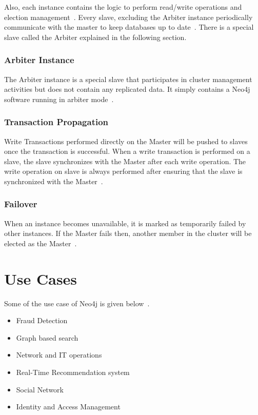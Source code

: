 \documentclass[9pt,twocolumn,twoside]{../../styles/osajnl}
\begin{document}
Also, each instance contains the logic to perform read/write operations and election management~\cite{www-neo4j-ha}. Every slave, excluding the Arbiter instance periodically communicate with the master to keep databases up to date~\cite{www-neo4j-ha}. There is a special slave called the Arbiter explained in the following section.
\subsubsection{Arbiter Instance}
The Arbiter instance is a special slave  that participates in cluster management activities but does not contain any replicated data. It simply contains a Neo4j software running in arbiter mode~\cite{www-neo4j-ha}. 
\subsubsection{Transaction Propagation}
Write Transactions performed directly on the Master will be pushed to slaves once the transaction is successful. When a write transaction is performed on a slave, the slave synchronizes with the Master after each write operation. The write operation on slave is always performed after ensuring that the slave is synchronized with the Master~\cite{www-neo4j-ha}. 

\subsubsection{Failover}
When an instance becomes unavailable, it is marked as temporarily failed by other instances. If the Master fails then, another member in the cluster will be elected as the Master~\cite{www-neo4j-ha}. 

\section{Use Cases}
Some of the use case of Neo4j is given below~\cite{www-neo4j-uc}.
\begin{itemize}
    \item Fraud Detection
    \item Graph based search
    \item Network and IT operations
    \item Real-Time Recommendation system
    \item Social Network
    \item Identity and Access Management
\end{itemize}
\end{document}
